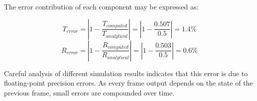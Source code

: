 The error contribution of each component may be expressed as:

\begin{equation}
T_{error} = |1 - \frac{T_{computed}}{T_{analytical}}| = |1 - \frac{0.507}{0.5}| = 1.4\%
\end{equation}
\begin{equation}
R_{error} = |1 - \frac{R_{computed}}{R_{analytical}}| = |1 - \frac{0.503}{0.5}| = 0.6\%
\end{equation}

Careful analysis of different simulation results indicates that this error is due to floating-point precision errors. As every frame output depends on the state of the previous frame, small errors are compounded over time. 




